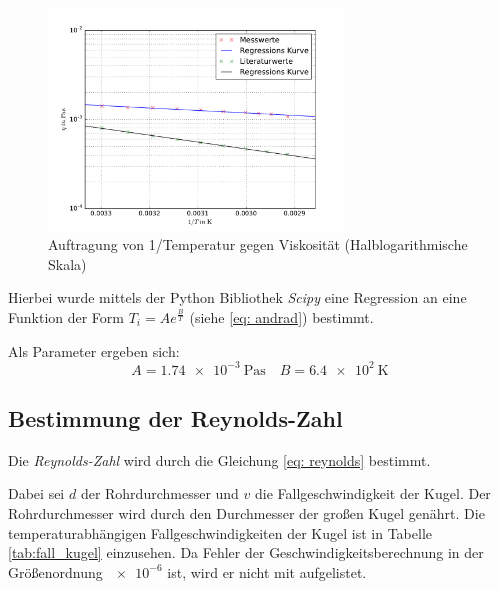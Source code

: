 \begin{figure}
\centering
\includegraphics[width=0.7\textwidth]{pics/viskositaet_temp__log_mit_lit.pdf}
\caption{ Auftragung von 1/Temperatur gegen Viskosität (Halblogarithmische Skala)} %
\label{fig:t_v_l_v}
\end{figure}
\FloatBarrier

Hierbei wurde mittels der Python Bibliothek \emph{Scipy} eine
Regression an eine Funktion der Form $T_i = Ae^{\frac{B}{T}}$ (siehe \eqref{eq: andrad}) bestimmt. %

Als Parameter ergeben sich:
\begin{equation*}
A=\SI{1.74e-3}{\pascal\second} \quad B=\SI{6.4e2}{\kelvin} %
\end{equation*}

\subsection{Bestimmung der Reynolds-Zahl}

Die \emph{Reynolds-Zahl} wird durch die Gleichung \eqref{eq: reynolds} bestimmt. %

Dabei sei $d$ der Rohrdurchmesser und $v$ die Fallgeschwindigkeit der Kugel.
Der Rohrdurchmesser wird durch den Durchmesser der großen Kugel genährt. %
Die temperaturabhängigen Fallgeschwindigkeiten der Kugel ist in Tabelle \ref{tab:fall_kugel} einzusehen.
Da Fehler der Geschwindigkeitsberechnung in der Größenordnung $\num{e-6}$ ist,
wird er nicht mit aufgelistet.

